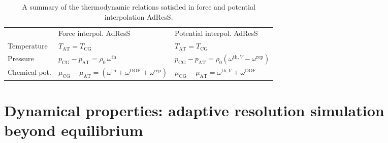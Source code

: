 \documentclass[epjST]{svjour}
\newcommand{\AT}[0]{\textrm{AT}}
\newcommand{\CG}[0]{\textrm{CG}}
\newcommand{\thf}{{\textrm{th}}}
\newcommand{\rep}{{\textrm{rep}}}
\newcommand{\dof}{{\textrm{DOF}}}
\begin{document}
\begin{table}
  \centering
  \caption{A summary of the thermodynamic relations satisfied in force and potential interpolation AdResS.}
  \label{tab:thermodynamic}
  \begin{tabular*}{0.99\textwidth}{@{\extracolsep{\fill}}lll}\hline\hline
    &         Force interpol. AdResS     &       Potential interpol. AdResS \\
    Temperature    &   {$T_\AT = T_\CG$}                                                & {$T_\AT = T_\CG$}                                        \\
    Pressure       &   {$p_\CG - p_\AT = \rho_0\, \omega^\thf$}                          & {$p_\CG - p_\AT = \rho_0(\omega^{\thf,V} - \omega^\rep)$} \\
    Chemical pot.  &   {$\mu_\CG - \mu_\AT = (\omega^\thf + \omega^\dof +\omega^\rep)$}   & {$\mu_\CG - \mu_\AT = \omega^{\thf,V}+ \omega^\dof$}      \\\hline\hline
  \end{tabular*}
\end{table}


\section{Dynamical properties: adaptive resolution simulation beyond equilibrium}
\label{sec:dynamical}
\end{document}
